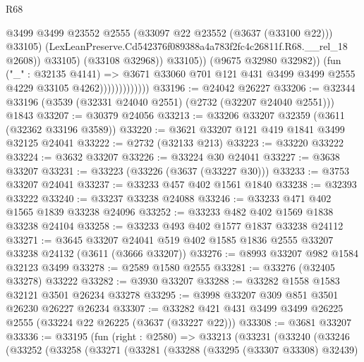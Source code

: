 \begin{lexlean}{R68}
\begin{coremodule}
                                          @3499
                                          @3499
                                          @23552
                                          @2555
                                          (@33097 @22 @23552 (@3637 (@33100 @22)))
                                          @33105)
                                        (LexLeanPreserve.Cd542376f089388a4a783f2fc4c26811f.R68.__rel_18
                                          @2608))
                                      @33105)
                                    (@33108 @32968))
                                  @33105))
                              (@9675 @32980 @32982))
                            (fun ("_" : @32135 @4141) =>
                            @3671
                              @33060
                              @701
                              @121
                              @431
                              @3499
                              @3499
                              @2555
                              @4229
                              @33105
                              @4262)))))))))))))
@33196 := @24042 @26227
@33206 := @32344 @33196 (@3539 (@32331 @24040 @2551) (@2732 (@32207 @24040 @2551))) @1843
@33207 := @30379 @24056
@33213 := @33206 @33207 @32359 (@3611 (@32362 @33196 @3589))
@33220 := @3621 @33207 @121 @419 @1841 @3499 @32125 @24041
@33222 := @2732 (@32133 @213)
@33223 := @33220 @33222
@33224 := @3632 @33207
@33226 := @33224 @30 @24041
@33227 := @3638 @33207
@33231 := @33223 (@33226 (@3637 (@33227 @30)))
@33233 := @3753 @33207 @24041
@33237 := @33233 @457 @402 @1561 @1840
@33238 := @32393 @33222
@33240 := @33237 @33238 @24088
@33246 := @33233 @471 @402 @1565 @1839 @33238 @24096
@33252 := @33233 @482 @402 @1569 @1838 @33238 @24104
@33258 := @33233 @493 @402 @1577 @1837 @33238 @24112
@33271 := @3645
    @33207
    @24041
    @519
    @402
    @1585
    @1836
    @2555
    @33207
    @33238
    @24132
    (@3611 (@3666 @33207))
@33276 := @8993 @33207 @982 @1584 @32123 @3499
@33278 := @2589 @1580 @2555
@33281 := @33276 (@32405 @33278) @33222
@33282 := @3930 @33207
@33288 := @33282 @1558 @1583 @32121 @3501 @26234 @33278
@33295 := @3998 @33207 @309 @851 @3501 @26230 @26227 @26234
@33307 := @33282 @421 @431 @3499 @3499 @26225 @2555 (@33224 @22 @26225 (@3637 (@33227 @22)))
@33308 := @3681 @33207
@33336 := @33195
    (fun (right : @2580) =>
    @33213
      (@33231
        (@33240
          (@33246
            (@33252
              (@33258
                (@33271
                  (@33281
                    (@33288
                      (@33295 (@33307 @33308) @32439)

\end{coremodule}
\end{lexlean}
